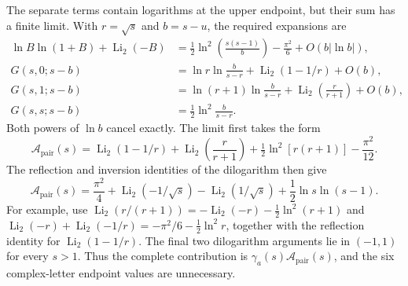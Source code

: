 The separate terms contain logarithms at the upper endpoint, but their
sum has a finite limit. With $r=\sqrt{s}$ and $b=s-u$, the required
expansions are
\begin{align}
 \ln B\ln(1+B)+\operatorname{Li}_2(-B)
 &=\tfrac12\ln^2\!\left(\frac{s(s-1)}b\right)
      -\frac{\pi^2}{6}+O(b|\ln b|),\\
 G(s,0;s-b)&=\ln r\ln\frac b{s-r}
           +\operatorname{Li}_2(1-1/r)+O(b),\\
 G(s,1;s-b)&=\ln(r+1)\ln\frac b{s-r}
           +\operatorname{Li}_2\!\left(\frac r{r+1}\right)+O(b),\\
 G(s,s;s-b)&=\tfrac12\ln^2\frac b{s-r}.
\end{align}
Both powers of $\ln b$ cancel exactly. The limit first takes the form
\begin{equation}
 \mathcal A_{\mathrm{pair}}(s)=\operatorname{Li}_2(1-1/r)
 +\operatorname{Li}_2\!\left(\frac r{r+1}\right)
 +\tfrac12\ln^2[r(r+1)]-\frac{\pi^2}{12}.
\end{equation}
The reflection and inversion identities of the dilogarithm then give
\begin{equation}
 \boxed{\mathcal A_{\mathrm{pair}}(s)=\frac{\pi^2}{4}
       +\operatorname{Li}_2(-1/\sqrt{s})
       -\operatorname{Li}_2(1/\sqrt{s})
       +\frac12\ln s\ln(s-1).}
 \label{eq:comp-real-a-pair-endpoint}
\end{equation}
For example, use
$\operatorname{Li}_2(r/(r+1))=-\operatorname{Li}_2(-r)
-\tfrac12\ln^2(r+1)$ and
$\operatorname{Li}_2(-r)+\operatorname{Li}_2(-1/r)
=-\pi^2/6-\tfrac12\ln^2r$, together with the reflection identity
for $\operatorname{Li}_2(1-1/r)$.
The final two dilogarithm arguments lie in $(-1,1)$ for every $s>1$.
Thus the complete contribution is
$\gamma_a(s)\mathcal A_{\mathrm{pair}}(s)$, and the six complex-letter endpoint values
are unnecessary.
